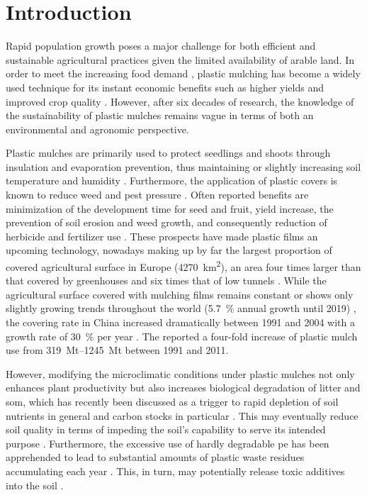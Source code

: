 \section{Introduction}
\label{sec:plastic-mulching:intro}

Rapid population growth poses a major challenge for both efficient and sustainable agricultural practices given the limited availability of arable land. In order to meet the increasing food demand \citep{GodfrayFood2010}, plastic mulching has become a widely used technique for its instant economic benefits such as higher yields and improved crop quality \citep{LamontPlastic1993}. However, after six decades of research, the knowledge of the sustainability of plastic mulches remains vague in terms of both an environmental and agronomic perspective.

Plastic mulches are primarily used to protect seedlings and shoots through insulation and evaporation prevention, thus maintaining or slightly increasing soil temperature and humidity \citep{TararaMicroclimate2000}. Furthermore, the application of plastic covers is known to reduce weed and pest pressure \citep{McKenzieLandscape2001}. Often reported benefits are minimization of the development time for seed and fruit, yield increase, the prevention of soil erosion and weed growth, and consequently reduction of herbicide and fertilizer use \citep{Chalker-ScottImpact2007,EspiPlastic2006,LamontPlastic1993, Scarascia-MugnozzaPlastic2011}. These prospects have made plastic films an upcoming technology, nowadays making up by far the largest proportion of covered agricultural surface
in Europe (\SI{4270}{\square\kilo\meter}), an area four times larger than that covered by greenhouses and six times that of low tunnels \citep{Scarascia-MugnozzaPlastic2011}. While the agricultural surface covered with mulching films remains constant or shows only slightly growing trends throughout the world (\SI{5.7}{\percent} annual growth until 2019) \citep{TransparencyMarketResearchAgricultural2013}, the covering rate in China increased dramatically between 1991 and 2004 with a growth rate of \SI{30}{\percent} per year \citep{EspiPlastic2006}. The \citet{NationalBureauofStatisticsofChinaChina2012} reported a four-fold increase of plastic mulch use from \SIrange[range-phrase = { to }]{319}{1245}{\mega\tonne} between 1991 and 2011.

However, modifying the microclimatic conditions under plastic mulches not only enhances plant productivity but also increases biological degradation of litter and \ac{som}, which has recently been discussed as a trigger to rapid depletion of soil nutrients in general and carbon stocks in particular \citep{Domagala-SwiatkiewiczEffect2013,ZhangEffects2015}. This may eventually reduce soil quality in terms of impeding the soil's capability to serve its intended purpose \citep{DoranDefining1994}.
Furthermore, the excessive use of hardly degradable \ac{pe} has been apprehended to lead to substantial amounts of plastic waste residues accumulating each year \citep{AlbertssonMechanism1987}. This, in turn, may potentially release toxic additives into the soil \citep{RamosPolyethylene2015}.

